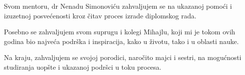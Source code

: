 {\it

{\noindent Svom mentoru, dr Nenadu Simonoviću zahvaljujem se na ukazanoj pomoći i izuzetnoj posvećenosti kroz čitav proces izrade diplomskog rada.

\noindent Posebno se zahvaljujem svom suprugu i kolegi Mihajlu, koji mi je tokom ovih godina bio najveća podrška i inspiracija, kako u životu, tako i u oblasti nauke.

\noindent Na kraju, zahvaljujem se svojoj porodici, naročito majci i sestri, na mogućnosti studiranja uopšte i ukazanoj podršci u toku procesa.}
}